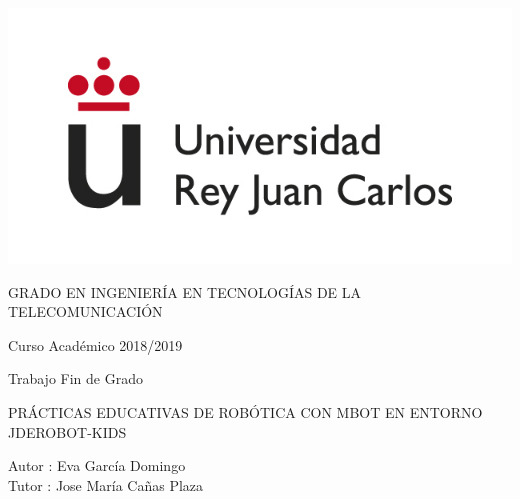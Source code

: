 \documentclass[a4paper, 12pt]{book}
\begin{document}
	\begin{titlepage}
		\centering
		\includegraphics[scale=0.5]{img/logo_urjc.jpg}
		\vspace{3cm}
		
		\Large
		GRADO EN INGENIERÍA EN TECNOLOGÍAS DE LA TELECOMUNICACIÓN
		
		\vspace{0.4cm}
		
		\large
		Curso Académico 2018/2019
		
		\vspace{0.8cm}
		
		Trabajo Fin de Grado
		
		\vspace{2.5cm}		
		\LARGE		
		PRÁCTICAS EDUCATIVAS DE ROBÓTICA CON MBOT EN ENTORNO JDEROBOT-KIDS
		
		\vspace{2.5 cm}
		
		\large
		Autor : Eva García Domingo\\
		Tutor : Jose María Cañas Plaza
		\afterpage{\null\newpage}
		\pagestyle{empty}
	\end{titlepage}
	
	
	
	
	
	\tableofcontents
	\setcounter{page}{1}
	\mainmatter

	
	
	
	
	
	
	
	
	
	
\end{document}
